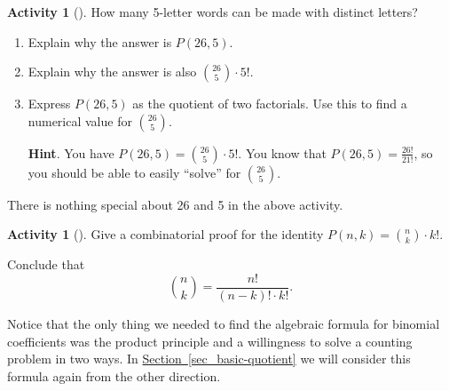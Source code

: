 \documentclass[10pt,]{book}
\theoremstyle{plain}
\theoremstyle{definition}
\theoremstyle{definition}
\theoremstyle{definition}
\newtheorem{activity}[project]{Activity}
\theoremstyle{definition}
\numberwithin{equation}{chapter}
\begin{document}
\begin{activity}[]\label{activity-35}
\hypertarget{p-572}{}%
How many 5-letter words can be made with distinct letters?%
\begin{enumerate}[font=\bfseries,label=(\alph*),ref=\alph*]
\item\label{task-67} \hypertarget{p-573}{}%
Explain why the answer is \(P(26,5)\).%
\item\label{task-68} \hypertarget{p-574}{}%
Explain why the answer is also \(\binom{26}{5}\cdot 5!\).%
\item\label{task-69} \hypertarget{p-575}{}%
Express \(P(26,5)\) as the quotient of two factorials.  Use this to find a numerical value for \(\binom{26}{5}\).%
\par\smallskip%
\noindent\textbf{Hint}.\hypertarget{hint-24}{}\quad%
\hypertarget{p-576}{}%
You have \(P(26,5) = \binom{26}{5}\cdot 5!\).  You know that \(P(26,5) = \frac{26!}{21!}\), so you should be able to easily ``solve'' for \(\binom{26}{5}\).%
\end{enumerate}
\end{activity}
\hypertarget{p-577}{}%
There is nothing special about 26 and 5 in the above activity.%
\begin{activity}[]\label{act-binomformula}
\hypertarget{p-578}{}%
Give a combinatorial proof for the identity \(P(n,k) = \binom{n}{k}\cdot k!\).%
\par
\hypertarget{p-579}{}%
Conclude that%
\begin{equation*}
\binom{n}{k} = \frac{n!}{(n-k)!\cdot k!}\text{.}
\end{equation*}
%
\end{activity}
\hypertarget{p-580}{}%
Notice that the only thing we needed to find the algebraic formula for binomial coefficients was the product principle and a willingness to solve a counting problem in two ways.  In \hyperref[sec_basic-quotient]{Section~\ref{sec_basic-quotient}} we will consider this formula again from the other direction.%
\typeout{************************************************}
\typeout{************************************************}
\end{document}
